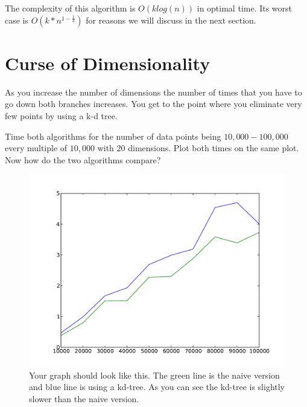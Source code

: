 The complexity of this algorithm is $O(klog(n))$ in optimal time.
Its worst case is $O(k*n^{1-\frac{1}{k}})$ for reasons we will discuss in the next section.
\section*{Curse of Dimensionality}

As you increase the number of dimensions the number of times that you have to go down both branches increases.
You get to the point where you eliminate very few points by using a k-d tree.

\begin{problem}
Time both algorithms for the number of data points being $10,000-100,000$ every multiple of $10,000$ with $20$ dimensions.
Plot both times on the same plot. Now how do the two algorithms compare?
\end{problem}

\begin{figure}[H]
\includegraphics[scale = .5]{20dTime.pdf}
\caption{
Your graph should look like this.
The green line is the naive version and blue line is using a kd-tree.
As you can see the kd-tree is slightly slower than the naive version.}
\end{figure}

